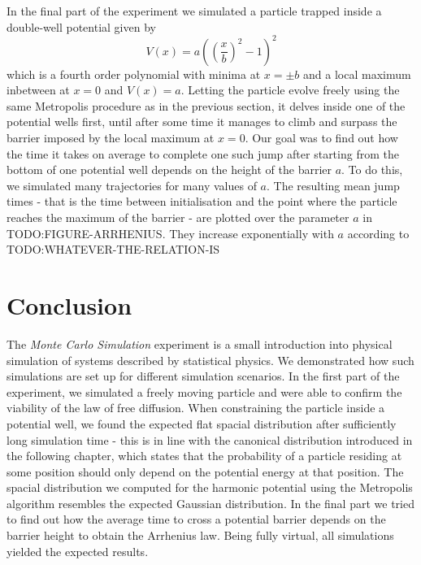 \documentclass[
    parskip=half, 
    twoside=false,
    twocolumn=true,
    fontsize=11pt,
]{scrarticle}
\begin{document}
In the final part of the experiment we simulated a particle trapped inside a double-well potential given by
\begin{equation}
 V(x) = a\left(\left(\frac{x}{b}\right)^2-1\right)^2
\end{equation}
which is a fourth order polynomial with minima at $x=\pm b$ and a local maximum inbetween at $x=0$ and $V(x)=a$. Letting the particle evolve freely using the same Metropolis procedure as in the previous section, it delves inside one of the potential wells first, until after some time it manages to climb and surpass the barrier imposed by the local maximum at $x=0$. Our goal was to find out how the time it takes on average to complete one such jump after starting from the bottom of one potential well depends on the height of the barrier $a$. To do this, we simulated many trajectories for many values of $a$. The resulting mean jump times - that is the time between initialisation and the point where the particle reaches the maximum of the barrier - are plotted over the parameter $a$ in TODO:FIGURE-ARRHENIUS. They increase exponentially with $a$ according to TODO:WHATEVER-THE-RELATION-IS

\section{Conclusion}

The \textit{Monte Carlo Simulation} experiment is a small introduction into physical simulation of systems described by statistical physics. We demonstrated how such simulations are set up for different simulation scenarios. In the first part of the experiment, we simulated a freely moving particle and were able to confirm the viability of the law of free diffusion. When constraining the particle inside a potential well, we found the expected flat spacial distribution after sufficiently long simulation time - this is in line with the canonical distribution introduced in the following chapter, which states that the probability of a particle residing at some position should only depend on the potential energy at that position. The spacial distribution we computed for the harmonic potential using the Metropolis algorithm resembles the expected Gaussian distribution. In the final part we tried to find out how the average time to cross a potential barrier depends on the barrier height to obtain the Arrhenius law. Being fully virtual, all simulations yielded the expected results.

\nocite{*}
\printbibliography
\end{document}
